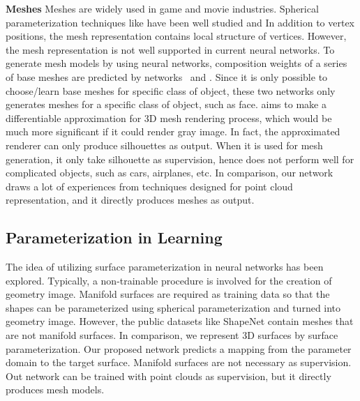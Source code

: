 \noindent\textbf{Meshes}
Meshes are widely used in game and movie industries. Spherical parameterization techniques like \cite{HuAHSP2018} have been well studied and 
In addition to vertex positions, the mesh representation contains local structure of vertices. 
However, the mesh representation is not well supported in current neural networks.
% 
To generate mesh models by using neural networks, composition weights of a series of base meshes are predicted by networks~\cite{img2mesh} and \cite{endface}. %
Since it is only possible to choose/learn base meshes for specific class of object, these two networks only generates meshes for a specific class of object, such as face.
%
\cite{3Drender} aims to make a differentiable approximation for 3D mesh rendering process, which would be much more significant if it could render gray image. 
In fact, the approximated renderer can only produce silhouettes as output. 
When it is used for mesh generation, it only take silhouette as supervision, hence does not perform well for complicated objects, such as cars, airplanes, etc.
%
In comparison, our network draws a lot of experiences from techniques designed for point cloud representation, and it directly produces meshes as output.

\subsection{Parameterization in Learning}
The idea of utilizing surface parameterization in neural networks has been explored\cite{surfnet,geoimg}. 
Typically, a non-trainable procedure is involved for the creation of geometry image. 
Manifold surfaces are required as training data so that the shapes can be parameterized using spherical parameterization and turned into geometry image. However, the public datasets like ShapeNet\cite{shapenetdata} contain meshes that are not manifold surfaces. 
In comparison, we represent 3D surfaces by surface parameterization. 
Our proposed network predicts a mapping from the parameter domain to the target surface. Manifold surfaces are not necessary as supervision.
Out network can be trained with point clouds as supervision, but it directly produces mesh models.

